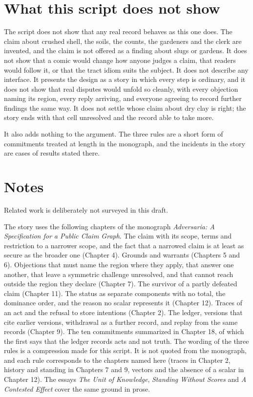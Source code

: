 \documentclass[11pt]{article}
\begin{document}
\section{What this script does not show}

The script does not show that any real record behaves as this one does. The claim about crushed shell, the soils, the counts, the gardeners and the clerk are invented, and the claim is not offered as a finding about slugs or gardens. It does not show that a comic would change how anyone judges a claim, that readers would follow it, or that the tract idiom suits the subject. It does not describe any interface. It presents the design as a story in which every step is ordinary, and it does not show that real disputes would unfold so cleanly, with every objection naming its region, every reply arriving, and everyone agreeing to record further findings the same way. It does not settle whose claim about dry clay is right; the story ends with that cell unresolved and the record able to take more.

It also adds nothing to the argument. The three rules are a short form of commitments treated at length in the monograph, and the incidents in the story are cases of results stated there.

\section*{Notes}


Related work is deliberately not surveyed in this draft.

The story uses the following chapters of the monograph \emph{Adversaria: A Specification for a Public Claim Graph}. The claim with its scope, terms and restriction to a narrower scope, and the fact that a narrowed claim is at least as secure as the broader one (Chapter 4). Grounds and warrants (Chapters 5 and 6). Objections that must name the region where they apply, that answer one another, that leave a symmetric challenge unresolved, and that cannot reach outside the region they declare (Chapter 7). The survivor of a partly defeated claim (Chapter 11). The status as separate components with no total, the dominance order, and the reason no scalar represents it (Chapter 12). Traces of an act and the refusal to store intentions (Chapter 2). The ledger, versions that cite earlier versions, withdrawal as a further record, and replay from the same records (Chapter 9). The ten commitments summarized in Chapter 18, of which the first says that the ledger records acts and not truth. The wording of the three rules is a compression made for this script. It is not quoted from the monograph, and each rule corresponds to the chapters named here (traces in Chapter 2, history and standing in Chapters 7 and 9, vectors and the absence of a scalar in Chapter 12). The essays \emph{The Unit of Knowledge}, \emph{Standing Without Scores} and \emph{A Contested Effect} cover the same ground in prose.
\end{document}
